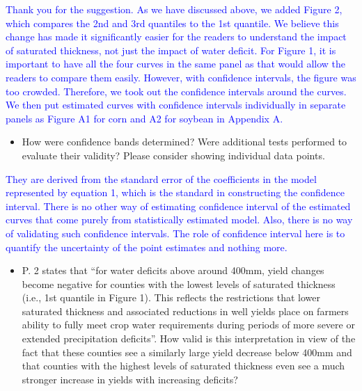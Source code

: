 \documentclass[
]{article}
\providecommand{\tightlist}{%
  \setlength{\itemsep}{0pt}\setlength{\parskip}{0pt}}
\begin{document}
\textcolor{blue}{Thank you for the suggestion. As we have discussed above, we added Figure 2, which compares the 2nd and 3rd quantiles to the 1st quantile. We believe this change has made it significantly easier for the readers to understand the impact of saturated thickness, not just the impact of water deficit. For Figure 1, it is important to have all the four curves in the same panel as that would allow the readers to compare them easily. However, with confidence intervals, the figure was too crowded. Therefore, we took out the confidence intervals around the curves. We then put estimated curves with confidence intervals individually in separate panels as Figure A1 for corn and A2 for soybean in Appendix A.}

\begin{itemize}
\tightlist
\item
  How were confidence bands determined? Were additional tests performed
  to evaluate their validity? Please consider showing individual data
  points.
\end{itemize}

\textcolor{blue}{They are derived from the standard error of the coefficients in the model represented by equation 1, which is the standard in constructing the confidence interval. There is no other way of estimating confidence interval of the estimated curves that come purely from statistically estimated model. Also, there is no way of validating such confidence intervals. The role of confidence interval here is to quantify the uncertainty of the point estimates and nothing more.}

\begin{itemize}
\tightlist
\item
  P. 2 states that ``for water deficits above around 400mm, yield
  changes become negative for counties with the lowest levels of
  saturated thickness (i.e., 1st quantile in Figure 1). This reflects
  the restrictions that lower saturated thickness and associated
  reductions in well yields place on farmers ability to fully meet crop
  water requirements during periods of more severe or extended
  precipitation deficits''. How valid is this interpretation in view of
  the fact that these counties see a similarly large yield decrease
  below 400mm and that counties with the highest levels of saturated
  thickness even see a much stronger increase in yields with increasing
  deficits?
\end{itemize}
\end{document}
